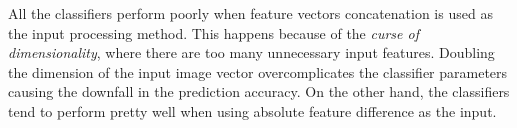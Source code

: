 All the classifiers perform poorly when feature vectors concatenation is used
as the input processing method. This happens because of the \emph{curse of
dimensionality}, where there are too many unnecessary input features. Doubling
the dimension of the input image vector overcomplicates the classifier
parameters causing the downfall in the prediction accuracy. On the other hand,
the classifiers tend to perform pretty well when using absolute feature
difference as the input.

